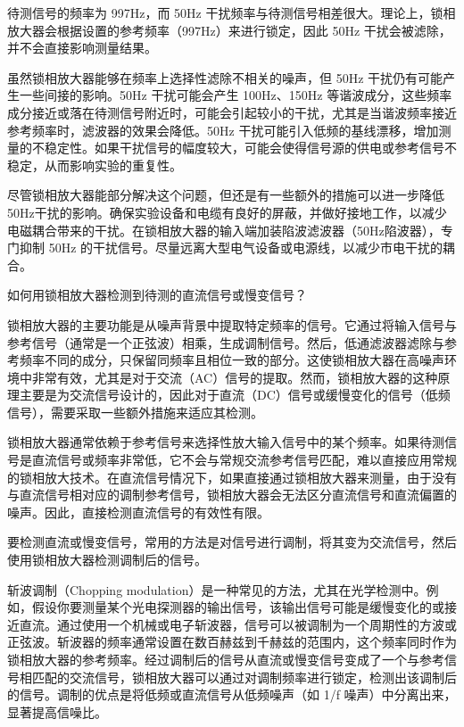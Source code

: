 待测信号的频率为 997Hz，而 50Hz 干扰频率与待测信号相差很大。理论上，锁相放大器会根据设置的参考频率（997Hz）来进行锁定，因此 50Hz 干扰会被滤除，并不会直接影响测量结果。

虽然锁相放大器能够在频率上选择性滤除不相关的噪声，但 50Hz 干扰仍有可能产生一些间接的影响。50Hz 干扰可能会产生 100Hz、150Hz 等谐波成分，这些频率成分接近或落在待测信号附近时，可能会引起较小的干扰，尤其是当谐波频率接近参考频率时，滤波器的效果会降低。50Hz 干扰可能引入低频的基线漂移，增加测量的不稳定性。如果干扰信号的幅度较大，可能会使得信号源的供电或参考信号不稳定，从而影响实验的重复性。

尽管锁相放大器能部分解决这个问题，但还是有一些额外的措施可以进一步降低50Hz干扰的影响。确保实验设备和电缆有良好的屏蔽，并做好接地工作，以减少电磁耦合带来的干扰。在锁相放大器的输入端加装陷波滤波器（50Hz陷波器），专门抑制 50Hz 的干扰信号。尽量远离大型电气设备或电源线，以减少市电干扰的耦合。

\begin{question}
	如何用锁相放大器检测到待测的直流信号或慢变信号？
\end{question}
锁相放大器的主要功能是从噪声背景中提取特定频率的信号。它通过将输入信号与参考信号（通常是一个正弦波）相乘，生成调制信号。然后，低通滤波器滤除与参考频率不同的成分，只保留同频率且相位一致的部分。这使锁相放大器在高噪声环境中非常有效，尤其是对于交流（AC）信号的提取。然而，锁相放大器的这种原理主要是为交流信号设计的，因此对于直流（DC）信号或缓慢变化的信号（低频信号），需要采取一些额外措施来适应其检测。

锁相放大器通常依赖于参考信号来选择性放大输入信号中的某个频率。如果待测信号是直流信号或频率非常低，它不会与常规交流参考信号匹配，难以直接应用常规的锁相放大技术。在直流信号情况下，如果直接通过锁相放大器来测量，由于没有与直流信号相对应的调制参考信号，锁相放大器会无法区分直流信号和直流偏置的噪声。因此，直接检测直流信号的有效性有限。

要检测直流或慢变信号，常用的方法是对信号进行调制，将其变为交流信号，然后使用锁相放大器检测调制后的信号。

斩波调制（Chopping modulation）是一种常见的方法，尤其在光学检测中。例如，假设你要测量某个光电探测器的输出信号，该输出信号可能是缓慢变化的或接近直流。通过使用一个机械或电子斩波器，信号可以被调制为一个周期性的方波或正弦波。斩波器的频率通常设置在数百赫兹到千赫兹的范围内，这个频率同时作为锁相放大器的参考频率。经过调制后的信号从直流或慢变信号变成了一个与参考信号相匹配的交流信号，锁相放大器可以通过对调制频率进行锁定，检测出该调制后的信号。调制的优点是将低频或直流信号从低频噪声（如 1/f 噪声）中分离出来，显著提高信噪比。

